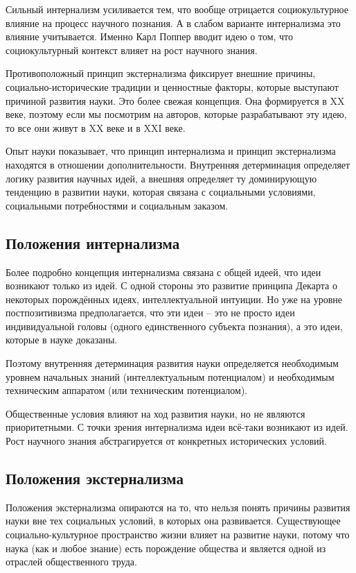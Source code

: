 \documentclass[main.tex]{subfiles}
\begin{document}
Сильный интернализм усиливается тем, что вообще отрицается социокультурное влияние на процесс научного познания.
А в слабом варианте интернализма это влияние учитывается.
Именно Карл Поппер вводит идею о том, что социокультурный контекст влияет на рост научного знания.

Противоположный принцип экстернализма фиксирует внешние причины, социально-исторические традиции и ценностные факторы, которые выступают причиной развития науки.
Это более свежая концепция.
Она формируется в XX веке, поэтому если мы посмотрим на авторов, которые разрабатывают эту идею, то все они живут в XX веке и в XXI веке.

Опыт науки показывает, что принцип интернализма и принцип экстернализма находятся в отношении дополнительности.
Внутренняя детерминация определяет логику развития научных идей, а внешняя определяет ту доминирующую тенденцию в развитии науки, которая связана с социальными условиями, социальными потребностями и социальным заказом.

\subsection{Положения интернализма}


Более подробно концепция интернализма связана с общей идеей, что идеи возникают только из идей.
С одной стороны это развитие принципа Декарта о некоторых порождённых идеях, интеллектуальной интуиции.
Но уже на уровне постпозитивизма предполагается, что эти идеи -- это не просто идеи индивидуальной головы (одного единственного субъекта познания), а это идеи, которые в науке доказаны.

Поэтому внутренняя детерминация развития науки определяется необходимым уровнем начальных знаний (интеллектуальным потенциалом) и необходимым техническим аппаратом (или техническим потенциалом).

Общественные условия влияют на ход развития науки, но не являются приоритетными.
С точки зрения интернализма идеи всё-таки возникают из идей.
Рост научного знания абстрагируется от конкретных исторических условий.

\subsection{Положения экстернализма}


Положения экстернализма опираются на то, что нельзя понять причины развития науки вне тех социальных условий, в которых она развивается.
Существующее социально-культурное пространство жизни влияет на развитие науки, потому что наука (как и любое знание) есть порождение общества и является одной из отраслей общественного труда.
\end{document}

